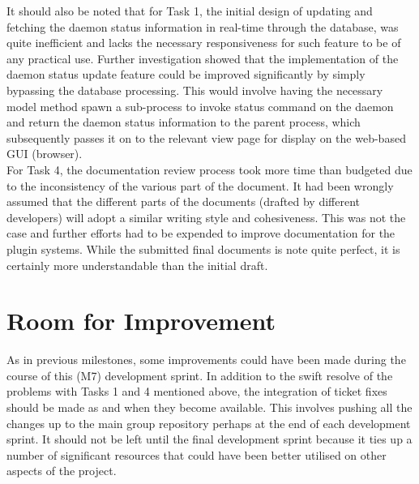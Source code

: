 It should also be noted that for Task 1, the initial design of updating and fetching the daemon status information in real-time through the database, was quite inefficient and lacks the necessary responsiveness for such feature to be of any practical use. Further investigation showed that the implementation of the daemon status update feature could be improved significantly by simply bypassing the database processing. This would involve having the necessary model method spawn a sub-process to invoke status command on the daemon and return the daemon status information to the parent process, which subsequently passes it on to the relevant view page for display on the web-based GUI (browser). \\

For Task 4, the documentation review process took more time than budgeted due to the inconsistency of the various part of the document. It had been wrongly assumed that the different parts of the documents (drafted by different developers) will adopt a similar writing style and cohesiveness. This was not the case and further efforts had to be expended to improve documentation for the plugin systems. While the submitted final documents is note quite perfect, it is certainly more understandable than the initial draft.


\section*{Room for Improvement}

As in previous milestones, some improvements could have been made during the course of this (M7) development sprint. In addition to the swift resolve of the problems with Tasks 1 and 4 mentioned above, the integration of ticket fixes should be made as and when they become available. This involves pushing all the changes up to the main group repository perhaps at the end of each development sprint. It should not be left until the final development sprint because it ties up a number of significant resources that could have been better utilised on other aspects of the project.

